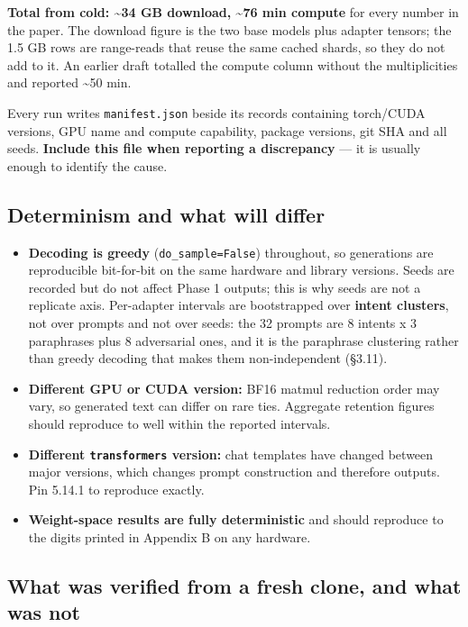 \textbf{Total from cold: \textasciitilde{}34 GB download, \textasciitilde{}76 min compute} for every number in the paper. The download figure is the two base models plus adapter tensors; the 1.5 GB rows are range-reads that reuse the same cached shards, so they do not add to it. An earlier draft totalled the compute column without the multiplicities and reported \textasciitilde{}50 min.

Every run writes \texttt{manifest.\allowbreak{}json} beside its records containing torch/CUDA versions, GPU name and compute capability, package versions, git SHA and all seeds. \textbf{Include this file when reporting a discrepancy} --- it is usually enough to identify the cause.

\subsection{Determinism and what will differ}

\begin{itemize}\itemsep1pt
\item \textbf{Decoding is greedy} (\texttt{do\_\allowbreak{}sample=False}) throughout, so generations are reproducible bit-for-bit on the same hardware and library versions. Seeds are recorded but do not affect Phase 1 outputs; this is why seeds are not a replicate axis. Per-adapter intervals are bootstrapped over \textbf{intent clusters}, not over prompts and not over seeds: the 32 prompts are 8 intents x 3 paraphrases plus 8 adversarial ones, and it is the paraphrase clustering rather than greedy decoding that makes them non-independent (\S{}3.11).
\item \textbf{Different GPU or CUDA version:} BF16 matmul reduction order may vary, so generated text can differ on rare ties. Aggregate retention figures should reproduce to well within the reported intervals.
\item \textbf{Different \texttt{transformers} version:} chat templates have changed between major versions, which changes prompt construction and therefore outputs. Pin 5.14.1 to reproduce exactly.
\item \textbf{Weight-space results are fully deterministic} and should reproduce to the digits printed in Appendix B on any hardware.
\end{itemize}

\subsection{What was verified from a fresh clone, and what was not}

